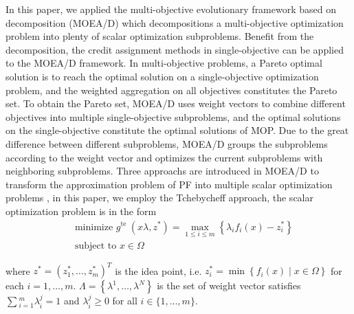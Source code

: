 \documentclass[journal]{IEEEtran}
\begin{document}
In this paper, we applied the multi-objective evolutionary framework based on decomposition (MOEA/D) \cite{moead} which decompositions a multi-objective optimization problem into plenty of scalar optimization subproblems. Benefit from the decomposition, the credit assignment methods in single-objective can be applied to the MOEA/D framework.
In multi-objective problems, a Pareto optimal solution is to reach the optimal solution on a single-objective optimization problem, and the weighted aggregation on all objectives constitutes the Pareto set.
To obtain the Pareto set, MOEA/D uses weight vectors to combine different objectives into multiple single-objective subproblems, and the optimal solutions on the single-objective constitute the optimal solutions of MOP.
Due to the great difference between different subproblems, MOEA/D groups the subproblems according to the weight vector and optimizes the current subproblems with neighboring subproblems.
Three approachs are introduced in MOEA/D to transform the approximation problem of PF into multiple scalar optimization problems \cite{moead}, in this paper, we employ the Tchebycheff approach, the scalar optimization problem is in the form
\begin{equation}
  \begin{aligned}
     & \text { minimize } g^{\text {te }}\left(x \lambda, z^{*}\right)=\max _{1 \leq i \leq m}\left\{\lambda_{i} f_{i}(x)-z_{i}^{*}\right\} \\
     & \text { subject to } x \in \Omega
  \end{aligned}
\end{equation}

where $z^{*}=\left(z_{1}^{*}, \ldots, z_{m}^{*}\right)^{T}$ is the idea point, i.e. $z_{i}^{*}=\min \left\{f_{i}(x) \mid x \in \Omega\right\}$ for each $i = 1, \dots , m$. $\Lambda=\left\{\lambda^{1}, \ldots, \lambda^{N}\right\}$ is the set of weight vector satisfies $\sum{^m_{i=1} \lambda ^j_i=1}$ and $\lambda^j_i \geq 0$ for all $i \in \{1,\dots, m\}$.
\end{document}
